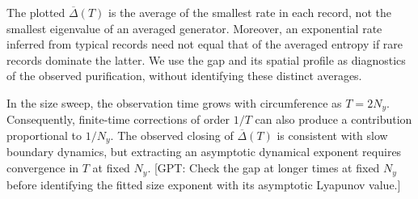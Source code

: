\documentclass[aps,prb,10pt,twocolumn,superscriptaddress,longbibliography,floatfix]{revtex4-2}
\newcommand{\GPT}[1]{{\color{magenta}[GPT: #1]}}
\begin{document}
{The plotted $\overline{\Delta}(T)$ is the average of the smallest rate in each record, not the smallest eigenvalue of an averaged generator. Moreover, an exponential rate inferred from typical records need not equal that of the averaged entropy if rare records dominate the latter. We use the gap and its spatial profile as diagnostics of the observed purification, without identifying these distinct averages.

In the size sweep, the observation time grows with circumference as $T=2N_y$. Consequently, finite-time corrections of order $1/T$ can also produce a contribution proportional to $1/N_y$. The observed closing of $\overline{\Delta}(T)$ is consistent with slow boundary dynamics, but extracting an asymptotic dynamical exponent requires convergence in $T$ at fixed $N_y$.
\GPT{Check the gap at longer times at fixed $N_y$ before identifying the fitted size exponent with its asymptotic Lyapunov value.}
}
\end{document}
